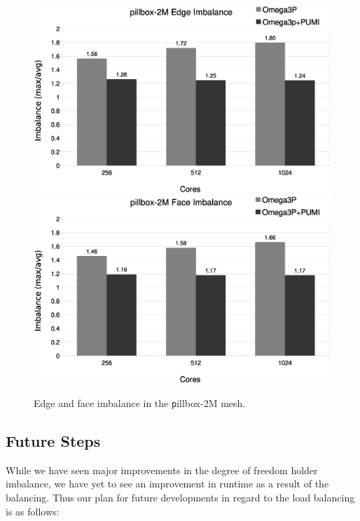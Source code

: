 \documentclass[review,12pt]{elsarticle_summary_report}
\begin{document}
\begin{figure}[ht]
\centering
  \includegraphics[width=\textwidth]{pillbox2M-edge-imb.eps} \\
  \includegraphics[width=\textwidth]{pillbox2M-face-imb.eps} \\
  \caption{\label{fig:pillboximb} Edge and face imbalance in the {\texttt
  pillbox-2M}
  mesh.}
\end{figure}

\subsection{\label{load_balance_future} Future Steps}

While we have seen major improvements in the degree of freedom holder imbalance,
we have yet to see an improvement in runtime as a result of the balancing. Thus
our plan for future developments in regard to the load balancing  is as follows:
\end{document}
